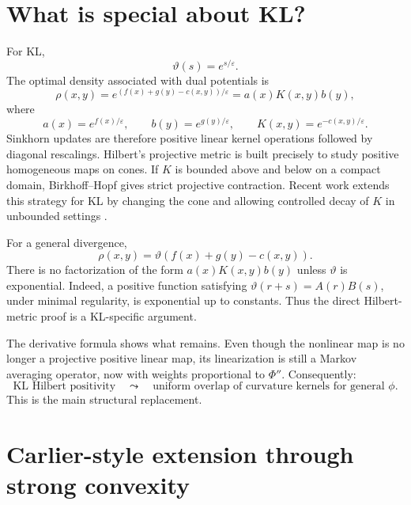 \documentclass[11pt]{article}
\newcommand{\eps}{\varepsilon}
\begin{document}
\section{What is special about KL?}\label{sec:kl}

For KL,
\begin{equation*}
  \vartheta(s)=e^{s/\eps}.
\end{equation*}
The optimal density associated with dual potentials is
\begin{equation}\label{eq:KLdensity}
  \rho(x,y)
  =e^{(f(x)+g(y)-c(x,y))/\eps}
  =a(x)K(x,y)b(y),
\end{equation}
where
\begin{equation*}
  a(x)=e^{f(x)/\eps},\qquad
  b(y)=e^{g(y)/\eps},\qquad
  K(x,y)=e^{-c(x,y)/\eps}.
\end{equation*}
Sinkhorn updates are therefore positive linear kernel operations followed by
diagonal rescalings.  Hilbert's projective metric is built precisely to study
positive homogeneous maps on cones.  If $K$ is bounded above and below on a
compact domain, Birkhoff--Hopf gives strict projective contraction.  Recent work
extends this strategy for KL by changing the cone and allowing controlled decay
of $K$ in unbounded settings \cite{eckstein2025}.

For a general divergence,
\begin{equation}\label{eq:general-density}
  \rho(x,y)=\vartheta(f(x)+g(y)-c(x,y)).
\end{equation}
There is no factorization of the form $a(x)K(x,y)b(y)$ unless
$\vartheta$ is exponential.  Indeed, a positive function satisfying
$\vartheta(r+s)=A(r)B(s)$, under minimal regularity, is exponential up to
constants.  Thus the direct Hilbert-metric proof is a KL-specific argument.

The derivative formula shows what remains.  Even though the nonlinear map is no
longer a projective positive linear map, its linearization is still a Markov
averaging operator, now with weights proportional to $\Phi''$.  Consequently:
\begin{equation*}
  \text{KL Hilbert positivity}
  \quad\leadsto\quad
  \text{uniform overlap of curvature kernels for general }\phi.
\end{equation*}
This is the main structural replacement.

\section{Carlier-style extension through strong convexity}\label{sec:carlier}
\end{document}
